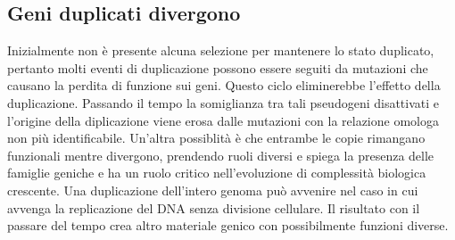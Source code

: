 \subsection{Geni duplicati divergono}
Inizialmente non \`e presente alcuna selezione per mantenere lo stato duplicato, pertanto molti eventi di duplicazione possono essere seguiti da mutazioni che causano la perdita di 
funzione sui geni. Questo ciclo eliminerebbe l'effetto della duplicazione. Passando il tempo la somiglianza tra tali pseudogeni disattivati e l'origine della diplicazione 
viene erosa dalle mutazioni con la relazione omologa non pi\`u identificabile. Un'altra possiblit\`a \`e che entrambe le copie rimangano funzionali mentre divergono, prendendo ruoli 
diversi e spiega la presenza delle famiglie geniche e ha un ruolo critico nell'evoluzione di complessit\`a biologica crescente. Una duplicazione dell'intero genoma pu\`o avvenire
nel caso in cui avvenga la replicazione del DNA senza divisione cellulare. Il risultato con il passare del tempo crea altro materiale genico con possibilmente funzioni diverse. 
